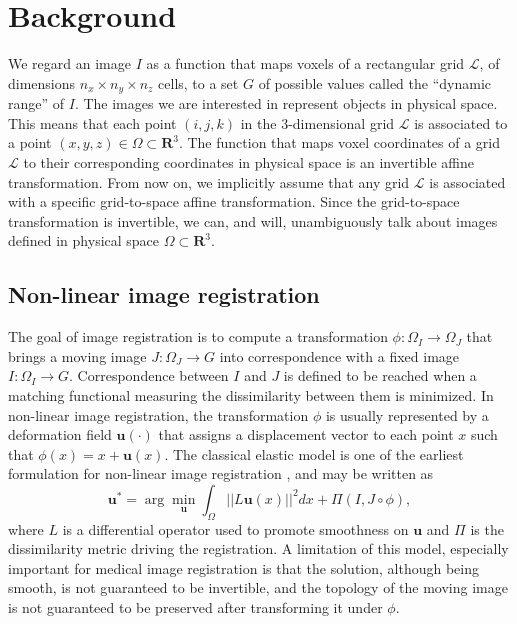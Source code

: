 \section{Background}
We regard an image $I$ as a function that maps voxels of a rectangular grid \hbox{$\mathcal{L}$}, of dimensions $n_{x} \times n_{y} \times n_{z}$ cells, to a set $G$ of
possible values called the ``dynamic range'' of $I$. The images we are interested in represent objects in physical space. This means that each point $(i,j,k)$ in the
3-dimensional grid $\mathcal{L}$ is associated to a point $(x,y,z) \in \Omega \subset \mathbf{R}^{3}$. The function that maps voxel coordinates of a grid $\mathcal{L}$ to their corresponding coordinates in physical space is an invertible affine transformation. From now on, we implicitly assume that any grid $\mathcal{L}$ is associated with a specific grid-to-space affine transformation. Since the grid-to-space transformation is invertible, we can, and will, unambiguously talk about images defined in physical space $\Omega \subset \mathbf{R}^{3}$.\\

\vspace{-0.5cm}
\subsection{Non-linear image registration}\label{sec:non_linear_image_registration}
The goal of image registration is to compute a transformation $\phi: \Omega_{I} \rightarrow \Omega_{J}$ that brings a moving image $J:\Omega_{J} \rightarrow G$ into correspondence
with a fixed image $I:\Omega_{I} \rightarrow G$. Correspondence between $I$ and $J$ is defined to be reached when a matching functional measuring the dissimilarity between them is minimized. In non-linear image registration, the transformation $\phi$ is usually represented by a deformation field $\mathbf{u(\cdot)}$ that assigns a displacement vector
to each point $x$ such that $\phi(x) = x + \mathbf{u}(x)$. The classical elastic model is one of the earliest formulation for non-linear image registration \cite{Bajcsy1982, Gee1999}, and may be written as
\begin{equation}\label{eq:elastic}
    \mathbf{u}^{*} = \arg \min_{\mathbf{u}} \int_{\Omega} ||L \mathbf{u}(x)||^{2}dx + \Pi(I, J \circ \phi),
\end{equation}
where $L$ is a differential operator used to promote smoothness on $\mathbf{u}$ and $\Pi$ is the dissimilarity metric driving the registration. A limitation of this model, especially important for medical image registration is that the solution, although being smooth, is not guaranteed to be invertible, and the topology of the moving image is not guaranteed to be preserved after transforming it under $\phi$.\\

